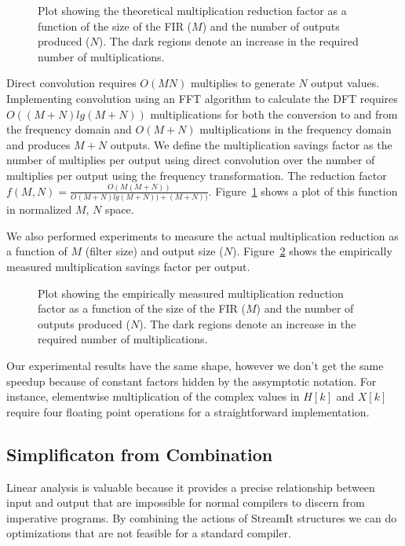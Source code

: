 \begin{figure}
\center
\epsfxsize=3.2in
\caption{Plot showing the theoretical multiplication reduction factor as a function of the size of the FIR ($M$) and the number of outputs produced ($N$). The dark regions denote an increase in the required number of multiplications.}
\label{fig:frequency-win-theory}
\vspace{-12pt}
\end{figure}

Direct convolution requires $O(MN)$ multiplies to generate $N$ output values. 
Implementing convolution using an FFT algorithm to calculate the DFT requires 
$O((M+N)lg(M+N))$ multiplications for both the conversion to and from the frequency domain
and $O(M+N)$ multiplications in the frequency domain and produces $M+N$ outputs.
We define the multiplication savings factor as the number of multiplies per output
using direct convolution over the number of multiplies per output using the 
frequency transformation. The reduction factor 
$f(M,N)=\frac{O(M(M+N))}{O(M+N)lg(M+N))+(M+N))}$.
Figure~\ref{fig:frequency-win-theory} shows a plot of this function in normalized 
$M$, $N$ space.

We also performed experiments to measure the actual multiplication reduction
as a function of $M$ (filter size) and output size ($N$).
Figure~\ref{fig:frequency-win-empirical} shows the empirically measured
multiplication savings factor per output.

\begin{figure}
\center
\epsfxsize=3.2in
\caption{Plot showing the empirically measured multiplication reduction factor as a function of the size of the FIR ($M$) and the number of outputs produced ($N$). The dark regions denote an increase in the required number of multiplications.}
\label{fig:frequency-win-empirical}
\vspace{-12pt}
\end{figure}

Our experimental results have the same shape, however we don't get the same
speedup because of constant factors hidden by the assymptotic notation. For instance,
elementwise multiplication of the complex values in $H[k]$ and $X[k]$ require
four floating point operations for a straightforward implementation.



\subsection{Simplificaton from Combination}
Linear analysis is valuable because it provides a precise relationship between input and output   
that are impossible for normal compilers to discern from imperative programs. By 
combining the actions of StreamIt structures we can do optimizations that are 
not feasible for a standard compiler.

